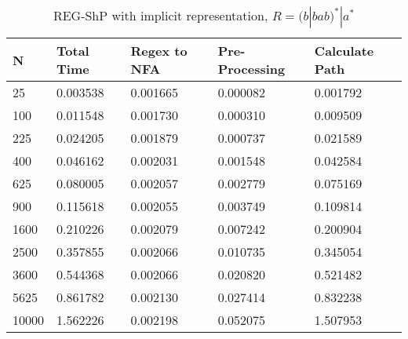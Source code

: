 \documentclass[]{article}
\numberwithin{equation}{section}
\begin{document}
\begin{appendices}
\begin{table}[H]
	\centering
	\small
	\setlength\tabcolsep{2pt}
	\begin{tabular}{|l|l|l|l|l|}
		\hline
		N     & Total Time & Regex to NFA & Pre-Processing & Calculate Path \\ \hline
		25    & 0.003538   & 0.001665     & 0.000082       & 0.001792       \\ \hline
		100   & 0.011548   & 0.001730     & 0.000310       & 0.009509       \\ \hline
		225   & 0.024205   & 0.001879     & 0.000737       & 0.021589       \\ \hline
		400   & 0.046162   & 0.002031     & 0.001548       & 0.042584       \\ \hline
		625   & 0.080005   & 0.002057     & 0.002779       & 0.075169       \\ \hline
		900   & 0.115618   & 0.002055     & 0.003749       & 0.109814       \\ \hline
		1600  & 0.210226   & 0.002079     & 0.007242       & 0.200904       \\ \hline
		2500  & 0.357855   & 0.002066     & 0.010735       & 0.345054       \\ \hline
		3600  & 0.544368   & 0.002066     & 0.020820       & 0.521482       \\ \hline
		5625  & 0.861782   & 0.002130     & 0.027414       & 0.832238       \\ \hline
		10000 & 1.562226   & 0.002198     & 0.052075       & 1.507953       \\ \hline
	\end{tabular}
	\caption{REG-ShP with implicit representation, $R = (b|bab)^*|a^*$}
\end{table}


\end{appendices}
\end{document}
